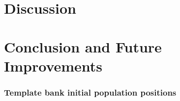 \section{\label{7:sec:discussion}Discussion}



\section{\label{7:sec:conclusion}Conclusion and Future Improvements}

\subsubsection{Template bank initial population positions}





